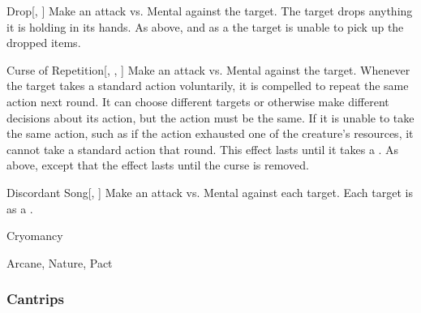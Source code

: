 \lowercase{\hypertarget{spell:Drop}{}}\label{spell:Drop}
\begin{freeability}[Rank 5]{\hypertarget{spell:Drop}{Drop}}[, ]
Make an attack vs. Mental against the target.
\hit The target drops anything it is holding in its hands.
\crit As above, and as a  the target is unable to pick up the dropped items.
\end{freeability}
\vspace{0.25em}



\lowercase{\hypertarget{spell:Curse of Repetition}{}}\label{spell:Curse of Repetition}
\begin{freeability}[Rank 6]{\hypertarget{spell:Curse of Repetition}{Curse of Repetition}}[, , ]
Make an attack vs. Mental against the target.
\hit Whenever the target takes a standard action voluntarily, it is compelled to repeat the same action next round.
It can choose different targets or otherwise make different decisions about its action, but the action must be the same.
If it is unable to take the same action, such as if the action exhausted one of the creature's resources, it cannot take a standard action that round.
This effect lasts until it takes a .
\crit As above, except that the effect lasts until the curse is removed.
\end{freeability}
\vspace{0.25em}



\lowercase{\hypertarget{spell:Discordant Song}{}}\label{spell:Discordant Song}
\begin{freeability}[Rank 7]{\hypertarget{spell:Discordant Song}{Discordant Song}}[, ]
Make an attack vs. Mental against each target.
\hit Each target is \disoriented as a .
\end{freeability}
\vspace{0.25em}


\newpage
\begin{spellsection}{Cryomancy}

\begin{spellheader}
\end{spellheader}


 Arcane, Nature, Pact

\subsubsection{Cantrips}


\end{spellsection}


